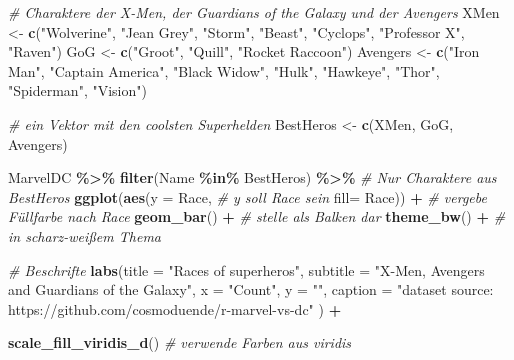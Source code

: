 \documentclass[
  ngerman,
]{book}
\newenvironment{Shaded}{\begin{snugshade}}{\end{snugshade}}
\newcommand{\AttributeTok}[1]{\textcolor[rgb]{0.13,0.29,0.53}{#1}}
\newcommand{\CommentTok}[1]{\textcolor[rgb]{0.56,0.35,0.01}{\textit{#1}}}
\newcommand{\FunctionTok}[1]{\textcolor[rgb]{0.13,0.29,0.53}{\textbf{#1}}}
\newcommand{\NormalTok}[1]{#1}
\newcommand{\OtherTok}[1]{\textcolor[rgb]{0.56,0.35,0.01}{#1}}
\newcommand{\SpecialCharTok}[1]{\textcolor[rgb]{0.81,0.36,0.00}{\textbf{#1}}}
\newcommand{\StringTok}[1]{\textcolor[rgb]{0.31,0.60,0.02}{#1}}
\begin{document}
\begin{Shaded}
\begin{Highlighting}[]
\CommentTok{\# Charaktere der X{-}Men, der Guardians of the Galaxy und der Avengers}
\NormalTok{XMen }\OtherTok{\textless{}{-}} \FunctionTok{c}\NormalTok{(}\StringTok{"Wolverine"}\NormalTok{, }\StringTok{"Jean Grey"}\NormalTok{, }\StringTok{"Storm"}\NormalTok{, }\StringTok{"Beast"}\NormalTok{, }
          \StringTok{"Cyclops"}\NormalTok{, }\StringTok{"Professor X"}\NormalTok{, }\StringTok{"Raven"}\NormalTok{)}
\NormalTok{GoG }\OtherTok{\textless{}{-}} \FunctionTok{c}\NormalTok{(}\StringTok{"Groot"}\NormalTok{, }\StringTok{"Quill"}\NormalTok{, }\StringTok{"Rocket Raccoon"}\NormalTok{)}
\NormalTok{Avengers }\OtherTok{\textless{}{-}} \FunctionTok{c}\NormalTok{(}\StringTok{"Iron Man"}\NormalTok{, }\StringTok{"Captain America"}\NormalTok{, }\StringTok{"Black Widow"}\NormalTok{, }
              \StringTok{"Hulk"}\NormalTok{, }\StringTok{"Hawkeye"}\NormalTok{, }\StringTok{"Thor"}\NormalTok{, }\StringTok{"Spiderman"}\NormalTok{, }\StringTok{"Vision"}\NormalTok{)}

\CommentTok{\# ein Vektor mit den coolsten Superhelden}
\NormalTok{BestHeros }\OtherTok{\textless{}{-}} \FunctionTok{c}\NormalTok{(XMen, GoG, Avengers)}

\NormalTok{MarvelDC }\SpecialCharTok{\%\textgreater{}\%}
  \FunctionTok{filter}\NormalTok{(Name }\SpecialCharTok{\%in\%}\NormalTok{ BestHeros) }\SpecialCharTok{\%\textgreater{}\%}     \CommentTok{\# Nur Charaktere aus \textquotesingle{}BestHeros\textquotesingle{}}
  \FunctionTok{ggplot}\NormalTok{(}\FunctionTok{aes}\NormalTok{(}\AttributeTok{y =}\NormalTok{ Race,                }\CommentTok{\# y soll \textquotesingle{}Race\textquotesingle{} sein}
             \AttributeTok{fill=}\NormalTok{ Race)) }\SpecialCharTok{+}           \CommentTok{\# vergebe Füllfarbe nach \textquotesingle{}Race\textquotesingle{}}
  \FunctionTok{geom\_bar}\NormalTok{() }\SpecialCharTok{+}                        \CommentTok{\# stelle als Balken dar}
  \FunctionTok{theme\_bw}\NormalTok{() }\SpecialCharTok{+}                        \CommentTok{\# in scharz{-}weißem Thema}
  
  \CommentTok{\# Beschrifte}
  \FunctionTok{labs}\NormalTok{(}\AttributeTok{title =} \StringTok{"Races of superheros"}\NormalTok{,}
       \AttributeTok{subtitle =} \StringTok{"X{-}Men, Avengers and Guardians of the Galaxy"}\NormalTok{,}
         \AttributeTok{x =} \StringTok{"Count"}\NormalTok{, }
         \AttributeTok{y =} \StringTok{""}\NormalTok{,}
         \AttributeTok{caption =} \StringTok{"dataset source: https://github.com/cosmoduende/r{-}marvel{-}vs{-}dc"}\NormalTok{ ) }\SpecialCharTok{+}
  
  \FunctionTok{scale\_fill\_viridis\_d}\NormalTok{()              }\CommentTok{\# verwende Farben aus viridis}
\end{Highlighting}
\end{Shaded}
\end{document}
